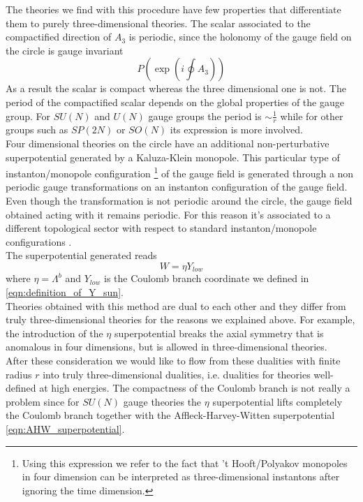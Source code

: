 The theories we find with this procedure have few properties that differentiate them to purely three-dimensional theories.
The scalar associated to the compactified direction of $A_3$ is periodic, since the holonomy of the gauge field on the circle is gauge invariant
\begin{equation}
 P\left( \exp{ \left( i \oint A_3 \right)}  \right) 
\end{equation}
As a result the scalar is compact whereas the three dimensional one is not. 
The period of the compactified scalar depends on the global properties of the gauge group. For $SU(N)$ and $U(N)$ gauge groups the period is $\sim \frac{1}{r}$ while for other groups such as $SP(2N)$ or $SO(N)$ its expression is more involved.\\
Four dimensional theories on the circle have an additional non-perturbative superpotential generated by a Kaluza-Klein monopole.
This particular type of instanton/monopole configuration
\footnote{Using this expression we refer to the fact that 't Hooft/Polyakov monopoles in four dimension can be interpreted as three-dimensional instantons after ignoring the time dimension.}
of the gauge field is generated through a non periodic gauge transformations on an instanton configuration of the gauge field.
Even though the transformation is not periodic around the circle, the gauge field obtained acting with it remains periodic. 
For this reason it's associated to a different topological sector with respect to standard instanton/monopole configurations \cite{Davies:1999uw}. \\
The superpotential generated reads
\begin{equation}
W = \eta Y_{low}
\label{eqn:W_eta_superpotential_first}
\end{equation}
where $\eta = \Lambda^b$ and $Y_{low}$ is the Coulomb branch coordinate we defined in \eqref{eqn:definition_of_Y_sun}.\\
Theories obtained with this method are dual to each other and they differ from truly three-dimensional theories for the reasons we explained above.
For example, the introduction of the $\eta$ superpotential breaks the axial symmetry that is anomalous in four dimensions, but is allowed in three-dimensional theories.\\
After these consideration we would like to flow from these dualities with finite radius $r$ into truly three-dimensional dualities, i.e. dualities for theories well-defined at high energies.
The compactness of the Coulomb branch is not really a problem since for $SU(N)$ gauge theories the $\eta$ superpotential lifts completely the Coulomb branch together with the Affleck-Harvey-Witten superpotential \eqref{eqn:AHW_superpotential}.
